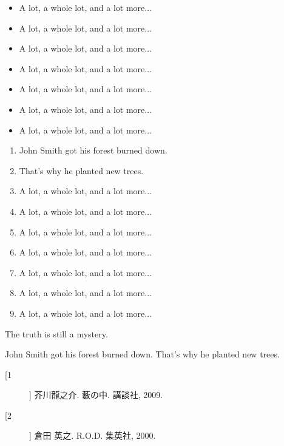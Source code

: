 \documentclass[a0,portrait]{a0poster}
\begin{document}
\begin{poster}
\begin{multicols}{2}
\begin{itemize}
  \item A lot, a whole lot, and a lot more...
  \item A lot, a whole lot, and a lot more...
  \item A lot, a whole lot, and a lot more...
  \item A lot, a whole lot, and a lot more...
  \item A lot, a whole lot, and a lot more...
  \item A lot, a whole lot, and a lot more...
  \item A lot, a whole lot, and a lot more...
\end{itemize}


\begin{enumerate}
  \item John Smith got his forest burned down.
  \item That's why he planted new trees.
  \item A lot, a whole lot, and a lot more...
  \item A lot, a whole lot, and a lot more...
  \item A lot, a whole lot, and a lot more...
  \item A lot, a whole lot, and a lot more...
  \item A lot, a whole lot, and a lot more...
  \item A lot, a whole lot, and a lot more...
  \item A lot, a whole lot, and a lot more...
\end{enumerate}

 The truth is still a mystery.

\end{multicols}

\vspace*{1em}
John Smith got his forest burned down.
That's why he planted new trees.

\begin{description}
  \item[[1]] 芥川龍之介. 藪の中. 講談社, 2009.
  \item[[2]] 倉田 英之. R.O.D. 集英社, 2000.
\end{description}

\end{poster}
\end{document}
